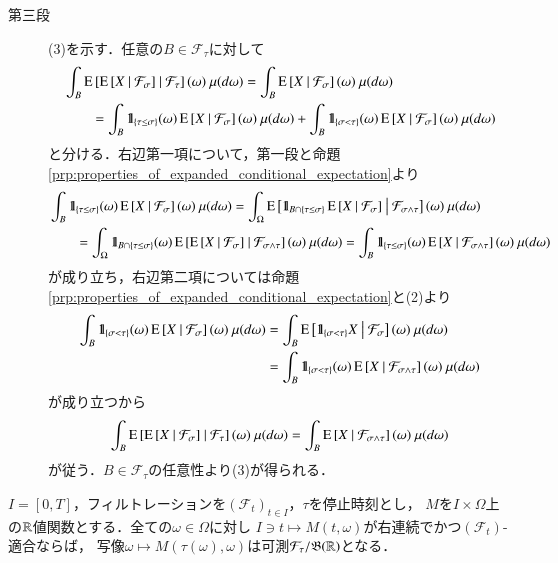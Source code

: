 \begin{prf}
\begin{description}
			\item[第三段]
				(3)を示す．任意の$B \in \mathcal{F}_\tau$に対して
				\begin{align}
					&\int_B \cexp{\cexp{X}{\mathcal{F}_\sigma}}{\mathcal{F}_\tau}(\omega)\ \mu(d\omega)
					= \int_B \cexp{X}{\mathcal{F}_\sigma}(\omega)\ \mu(d\omega) \\
					&\qquad = \int_B \defunc_{\{\tau \leq \sigma\}}(\omega) \cexp{X}{\mathcal{F}_\sigma}(\omega)\ \mu(d\omega)
						+ \int_B \defunc_{\{\sigma < \tau\}}(\omega) \cexp{X}{\mathcal{F}_\sigma}(\omega)\ \mu(d\omega)
				\end{align}
				と分ける．右辺第一項について，第一段と命題\ref{prp:properties_of_expanded_conditional_expectation}より
				\begin{align}
					&\int_B \mbox{1}\hspace{-0.25em}\mbox{l}_{\{\tau \leq \sigma\}}(\omega) \operatorname{E} \left[ X \ \middle|\ \mathcal{F}_\sigma \right](\omega)\ \mu(d\omega)
					= \int_\Omega \operatorname{E} \left[ \mbox{1}\hspace{-0.25em}\mbox{l}_{B \cap \{\tau \leq \sigma\}} \operatorname{E} \left[ X \ \middle|\ \mathcal{F}_\sigma \right] \ \middle|\ \mathcal{F}_{\sigma \wedge \tau} \right](\omega)\ \mu(d\omega) \\
					&\qquad = \int_\Omega \mbox{1}\hspace{-0.25em}\mbox{l}_{B \cap \{\tau \leq \sigma\}}(\omega) \operatorname{E} \left[ \operatorname{E} \left[ X \ \middle|\ \mathcal{F}_\sigma \right] \ \middle|\ \mathcal{F}_{\sigma \wedge \tau} \right](\omega)\ \mu(d\omega)
					= \int_B \mbox{1}\hspace{-0.25em}\mbox{l}_{\{\tau \leq \sigma\}}(\omega) \operatorname{E} \left[ X \ \middle|\ \mathcal{F}_{\sigma \wedge \tau} \right](\omega)\ \mu(d\omega)
				\end{align}
				が成り立ち，右辺第二項については命題\ref{prp:properties_of_expanded_conditional_expectation}と(2)より
				\begin{align}
					\int_B \mbox{1}\hspace{-0.25em}\mbox{l}_{\{\sigma < \tau\}}(\omega) \operatorname{E} \left[ X \ \middle|\ \mathcal{F}_\sigma \right](\omega)\ \mu(d\omega)
					&= \int_B \operatorname{E} \left[ \mbox{1}\hspace{-0.25em}\mbox{l}_{\{\sigma < \tau\}} X \ \middle|\ \mathcal{F}_\sigma \right](\omega)\ \mu(d\omega) \\
					&= \int_B \mbox{1}\hspace{-0.25em}\mbox{l}_{\{\sigma < \tau\}}(\omega) \operatorname{E} \left[ X \ \middle|\ \mathcal{F}_{\sigma \wedge \tau} \right](\omega)\ \mu(d\omega)
				\end{align}
				が成り立つから
				\begin{align}
					\int_B \cexp{\cexp{X}{\mathcal{F}_\sigma}}{\mathcal{F}_\tau}(\omega)\ \mu(d\omega)
					= \int_B \cexp{X}{\mathcal{F}_{\sigma \wedge \tau}}(\omega)\ \mu(d\omega)
				\end{align}
				が従う．$B \in \mathcal{F}_\tau$の任意性より(3)が得られる．
				\QED
		\end{description}
	\end{prf}
	
	\begin{screen}
		\begin{thm}[停止時刻との合成写像の可測性]
			$I = [0,T]$，フィルトレーションを$(\mathcal{F}_t)_{t \in I}$，$\tau$を停止時刻とし，
			$M$を$I \times \Omega$上の$\mathbb{R}$値関数とする．全ての$\omega \in \Omega$に対し
			$I \ni t \longmapsto M(t,\omega)$が右連続でかつ$(\mathcal{F}_t)$-適合ならば，
			写像$\omega \longmapsto M(\tau(\omega),\omega)$は可測$\mathcal{F}_\tau/\mathfrak{B}(\mathbb{R})$となる．
			\label{thm:measurability_of_stopping_time}
		\end{thm}
	\end{screen}
	
